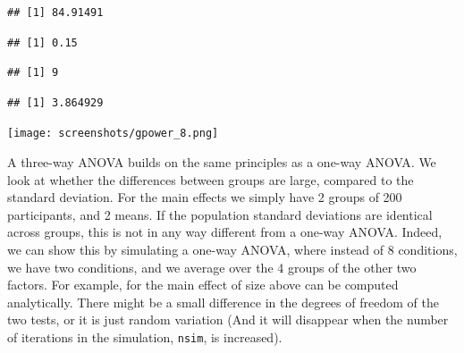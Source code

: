 \documentclass[
]{book}
\newenvironment{Shaded}{\begin{snugshade}}{\end{snugshade}}
\newcommand{\CommentTok}[1]{\textcolor[rgb]{0.56,0.35,0.01}{\textit{#1}}}
\newcommand{\NormalTok}[1]{#1}
\newcommand{\SpecialCharTok}[1]{\textcolor[rgb]{0.00,0.00,0.00}{#1}}
\begin{document}
\begin{verbatim}
## [1] 84.91491
\end{verbatim}

\begin{Shaded}
\end{Shaded}

\begin{verbatim}
## [1] 0.15
\end{verbatim}

\begin{Shaded}
\end{Shaded}

\begin{verbatim}
## [1] 9
\end{verbatim}

\begin{Shaded}
\end{Shaded}

\begin{verbatim}
## [1] 3.864929
\end{verbatim}

\texttt{[image: screenshots/gpower\_8.png]}

A three-way ANOVA builds on the same principles as a one-way ANOVA. We look at whether the differences between groups are large, compared to the standard deviation. For the main effects we simply have 2 groups of 200 participants, and 2 means. If the population standard deviations are identical across groups, this is not in any way different from a one-way ANOVA. Indeed, we can show this by simulating a one-way ANOVA, where instead of 8 conditions, we have two conditions, and we average over the 4 groups of the other two factors. For example, for the main effect of size above can be computed analytically. There might be a small difference in the degrees of freedom of the two tests, or it is just random variation (And it will disappear when the number of iterations in the simulation, \texttt{nsim}, is increased).
\end{document}
